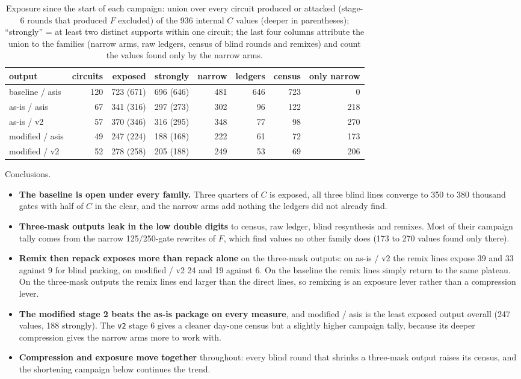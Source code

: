 \documentclass[11pt,a4paper]{article}
\newcommand{\code}[1]{\texttt{#1}}
\begin{document}
\begin{table}[H]\centering\small
\begin{tabular}{lrrrrrrr}
\toprule
output & circuits & exposed & strongly & narrow & ledgers & census & only narrow \\
\midrule
baseline / asis & 120 & 723 (671) & 696 (646) & 481 & 646 & 723 & 0 \\
as-is / asis & 67 & 341 (316) & 297 (273) & 302 & 96 & 122 & 218 \\
as-is / v2 & 57 & 370 (346) & 316 (295) & 348 & 77 & 98 & 270 \\
modified / asis & 49 & 247 (224) & 188 (168) & 222 & 61 & 72 & 173 \\
modified / v2 & 52 & 278 (258) & 205 (188) & 249 & 53 & 69 & 206 \\
\bottomrule
\end{tabular}
\caption{Exposure since the start of each campaign: union over every circuit produced or attacked (stage-6 rounds that produced $F$ excluded) of the 936 internal $C$ values (deeper in parentheses); ``strongly'' = at least two distinct supports within one circuit; the last four columns attribute the union to the families (narrow arms, raw ledgers, census of blind rounds and remixes) and count the values found only by the narrow arms.}
\end{table}
Conclusions.
\begin{itemize}
\item \textbf{The baseline is open under every family.} Three quarters of $C$ is exposed, all three blind lines converge to 350 to 380 thousand gates with half of $C$ in the clear, and the narrow arms add nothing the ledgers did not already find.
\item \textbf{Three-mask outputs leak in the low double digits} to census, raw ledger, blind resynthesis and remixes. Most of their campaign tally comes from the narrow 125/250-gate rewrites of $F$, which find values no other family does (173 to 270 values found only there).
\item \textbf{Remix then repack exposes more than repack alone} on the three-mask outputs: on as-is / v2 the remix lines expose 39 and 33 against 9 for blind packing, on modified / v2 24 and 19 against 6. On the baseline the remix lines simply return to the same plateau. On the three-mask outputs the remix lines end larger than the direct lines, so remixing is an exposure lever rather than a compression lever.
\item \textbf{The modified stage 2 beats the as-is package on every measure}, and modified / asis is the least exposed output overall (247 values, 188 strongly). The \code{v2} stage 6 gives a cleaner day-one census but a slightly higher campaign tally, because its deeper compression gives the narrow arms more to work with.
\item \textbf{Compression and exposure move together} throughout: every blind round that shrinks a three-mask output raises its census, and the shortening campaign below continues the trend.
\end{itemize}
\end{document}
